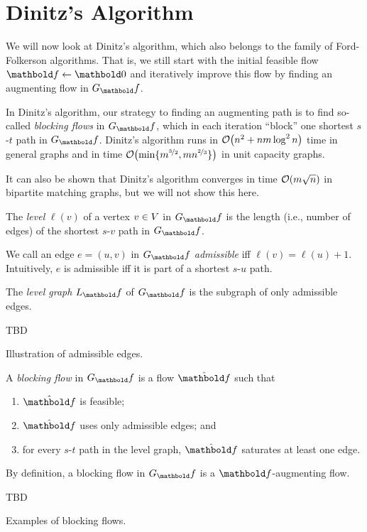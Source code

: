 \section{Dinitz's Algorithm}

We will now look at Dinitz's algorithm, which also belongs to the family of Ford-Folkerson algorithms. That is, we still start with the initial feasible flow $\vf \gets \vZero$ and iteratively improve this flow by finding an augmenting flow in $G_\vf$.

In Dinitz's algorithm, our strategy to finding an augmenting path is to find so-called \emph{blocking flows} in $G_\vf$, which in each iteration ``block'' one shortest $s$-$t$ path in $G_\vf$. Dinitz's algorithm runs in $\LandauO{n^2 + nm \log^2 n}$ time in general graphs and in time $\LandauO{\min\{m^{\nicefrac{3}{2}}, m n^{\nicefrac{2}{3}}\}}$ in unit capacity graphs.

\begin{rmk}
It can also be shown that Dinitz's algorithm converges in time $\LandauO{m \sqrt{n}}$ in bipartite matching graphs, but we will not show this here.
\end{rmk}

\begin{defn}[Level]
The \emph{level} $\ell(v)$ of a vertex $v \in V$ in $G_\vf$ is the length (i.e., number of edges) of the shortest $s$-$v$ path in $G_\vf$.

We call an edge $e = (u,v)$ in $G_\vf$ \emph{admissible} iff $\ell(v) = \ell(u)+1$. Intuitively, $e$ is admissible iff it is part of a shortest $s$-$u$ path.

The \emph{level graph} $L_\vf$ of $G_\vf$ is the subgraph of only admissible edges.
\end{defn}
\begin{marginfigure}
TBD
\caption{Illustration of admissible edges.}
\end{marginfigure}

\begin{defn}
A \emph{blocking flow} in $G_\vf$ is a flow $\hat{\vf}$ such that \begin{enumerate}
    \item $\hat{\vf}$ is feasible;
    \item $\hat{\vf}$ uses only admissible edges; and
    \item for every $s$-$t$ path in the level graph, $\hat{\vf}$ saturates at least one edge.
\end{enumerate}
\end{defn}
\begin{rmk}
By definition, a blocking flow in $G_\vf$ is a $\vf$-augmenting flow.
\end{rmk}
\begin{marginfigure}
TBD
\caption{Examples of blocking flows.}
\end{marginfigure}

